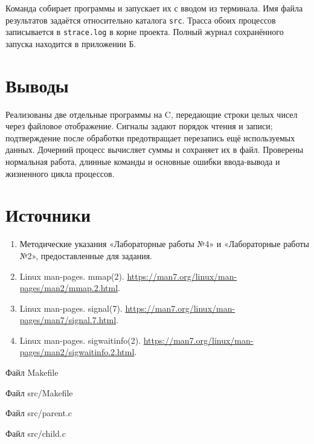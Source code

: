 \documentclass[12pt,a4paper]{article}
\begin{document}
Команда собирает программы и запускает их с вводом из терминала. Имя файла результатов задаётся относительно каталога \texttt{src}. Трасса обоих процессов записывается в \texttt{strace.log} в корне проекта. Полный журнал сохранённого запуска находится в приложении Б.

\section{Выводы}
Реализованы две отдельные программы на C, передающие строки целых чисел через файловое отображение. Сигналы задают порядок чтения и записи; подтверждение после обработки предотвращает перезапись ещё используемых данных. Дочерний процесс вычисляет суммы и сохраняет их в файл. Проверены нормальная работа, длинные команды и основные ошибки ввода-вывода и жизненного цикла процессов.

\section{Источники}
\begin{enumerate}
\item Методические указания «Лабораторные работы №4» и «Лабораторные работы №2», предоставленные для задания.
\item Linux man-pages. mmap(2). \url{https://man7.org/linux/man-pages/man2/mmap.2.html}.
\item Linux man-pages. signal(7). \url{https://man7.org/linux/man-pages/man7/signal.7.html}.
\item Linux man-pages. sigwaitinfo(2). \url{https://man7.org/linux/man-pages/man2/sigwaitinfo.2.html}.
\end{enumerate}

\begin{listingblock}{Файл Makefile}
\end{listingblock}

\begin{listingblock}{Файл src/Makefile}
\end{listingblock}

\begin{listingblock}{Файл src/parent.c}
\end{listingblock}

\begin{listingblock}{Файл src/child.c}
\end{listingblock}
\end{document}
